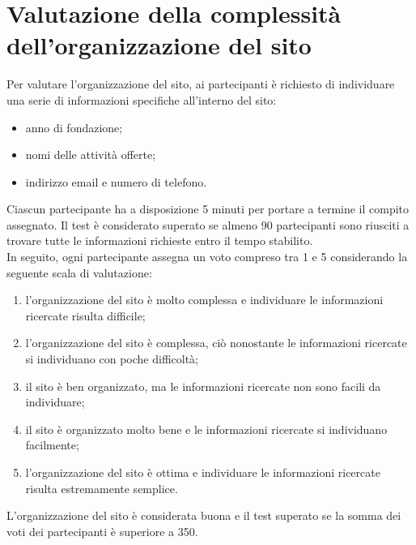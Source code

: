 \documentclass{article}
\begin{document}
\vspace{0.7cm}

\section{Valutazione della complessità dell'organizzazione del sito}
Per valutare l'organizzazione del sito, ai partecipanti è richiesto di individuare una serie di informazioni specifiche all'interno del sito:
\begin{itemize}
    \item anno di fondazione;
    \item nomi delle attività offerte;
    \item indirizzo email e numero di telefono.
\end{itemize}
Ciascun partecipante ha a disposizione 5 minuti per portare a termine il compito assegnato. Il test è considerato superato se almeno 90 partecipanti sono riusciti a trovare tutte le informazioni richieste entro il tempo stabilito.\\
In seguito, ogni partecipante assegna un voto compreso tra 1 e 5 considerando la seguente scala di valutazione:
\begin{enumerate}
    \item l'organizzazione del sito è molto complessa e individuare le informazioni ricercate risulta difficile;
    \item l'organizzazione del sito è complessa, ciò nonostante le informazioni ricercate si individuano con poche difficoltà;
    \item il sito è ben organizzato, ma le informazioni ricercate non sono facili da individuare;
    \item il sito è organizzato molto bene e le informazioni ricercate si individuano facilmente;
    \item l'organizzazione del sito è ottima e individuare le informazioni ricercate risulta estremamente semplice.
\end{enumerate}
L'organizzazione del sito è considerata buona e il test superato se la somma dei voti dei partecipanti è superiore a 350.

\vspace{0.7cm}
\end{document}
